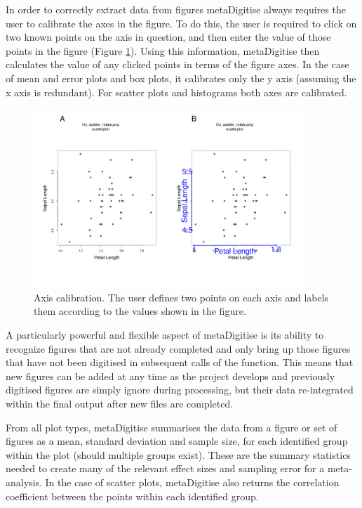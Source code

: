 \documentclass{article}
\begin{document}
In order to correctly extract data from figures metaDigitise always requires the user to calibrate the axes in the figure. To do this, the user is required to click on two known points on the axis in question, and then enter the value of those points in the figure (Figure \ref{fig:calibrate}). Using this information, metaDigitise then calculates the value of any clicked points in terms of the figure axes. In the case of mean and error plots and box plots, it calibrates only the y axis (assuming the x axis is redundant). For scatter plots and histograms both axes are calibrated.

\begin{figure}[!h] 
 \includegraphics[width=0.9\textwidth]{fig_calibrate.pdf} 
 \caption{Axis calibration. The user defines two points on each axis and labels them according to the values shown in the figure.}
\label{fig:calibrate}
\end{figure}

A particularly powerful and flexible aspect of metaDigitise is its ability to recognize figures that are not already completed and only bring up those figures that have not been digitised in subsequent calls of the function. This means that new figures can be added at any time as the project develops and previously digitised figures are simply ignore during processing, but their data re-integrated within the final output after new files are completed. 

From all plot types, metaDigitise summarises the data from a figure or set of figures as a mean, standard deviation and sample size, for each identified group within the plot (should multiple groups exist). These are the summary statistics needed to create many of the relevant effect sizes and sampling error for a meta-analysis. In the case of scatter plots, metaDigitise also returns the correlation coefficient between the points within each identified group. 
\end{document}
